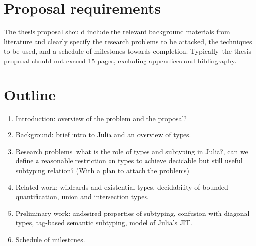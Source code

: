 \documentclass[11pt,
  footinclude,headinclude,
  abstract=on
]{scrreprt}
\begin{document}





\section{Proposal requirements}

The thesis proposal should include the relevant background materials from
literature and clearly specify the research problems to be attacked, the
techniques to be used, and a schedule of milestones towards completion.
Typically, the thesis proposal should not exceed 15 pages, excluding appendices
and bibliography.

\section{Outline}

\begin{enumerate}
  \item Introduction: overview of the problem and the proposal?
  \item Background: brief intro to Julia and an overview of types.
  \item Research problems: what is the role of types and subtyping in Julia?,
    can we define a reasonable restriction on types to achieve decidable but
    still useful subtyping relation? (With a plan to attach the problems)
  \item Related work: wildcards and existential types, decidability of bounded
    quantification, union and intersection types.
  \item Preliminary work: undesired properties of subtyping, confusion with
    diagonal types, tag-based semantic subtyping, model of Julia's JIT.
  \item Schedule of milestones.
\end{enumerate}






\end{document}
